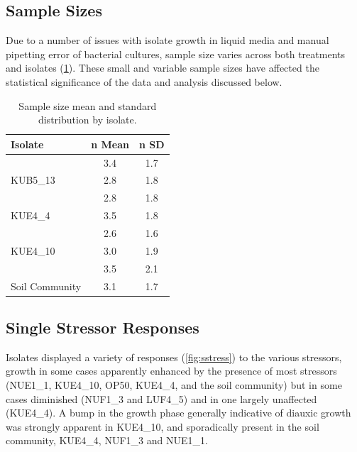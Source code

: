 \documentclass[final,1p,times]{elsarticle}
\begin{document}
\subsection{Sample Sizes}
\label{S:3:2}

Due to a number of issues with isolate growth in liquid media and manual pipetting error of bacterial cultures, sample size varies across both treatments and isolates (\cref{tab:samples}). These small and variable sample sizes have affected the statistical significance of the data and analysis discussed below.

\begin{table}[ht]
\centering
\small
\begin{tabular}{l c c}
\toprule 
\textbf{Isolate} & \textbf{n Mean} & \textbf{n SD}  \\
\midrule
\rowcolor{gggrey}{LUF4\_5} & 3.4 & 1.7 \\
{KUB5\_13} & 2.8 & 1.8 \\
\rowcolor{gggrey}{NUF1\_3} & 2.8 & 1.8\\
{KUE4\_4} & 3.5 & 1.8\\
\rowcolor{gggrey}{NUE1\_1} & 2.6 & 1.6\\
{KUE4\_10} & 3.0 & 1.9 \\
\rowcolor{gggrey}{OP50} & 3.5 & 2.1 \\
{Soil Community} & 3.1 & 1.7\\
\bottomrule
\end{tabular}
\caption{Sample size mean and standard distribution by isolate.}
\label{tab:samples}
\end{table}

\newpage
\subsection{Single Stressor Responses}
\label{S:3:3}

Isolates displayed a variety of responses (\cref{fig:sstress}) to the various stressors, growth in some cases apparently enhanced by the presence of most stressors (NUE1\_1, KUE4\_10, OP50, KUE4\_4, and the soil community) but in some cases diminished (NUF1\_3 and LUF4\_5) and in one largely unaffected (KUE4\_4). A bump in  the growth phase generally indicative of diauxic growth was strongly apparent in KUE4\_10, and sporadically present in the soil community, KUE4\_4, NUF1\_3 and NUE1\_1. 
\end{document}
